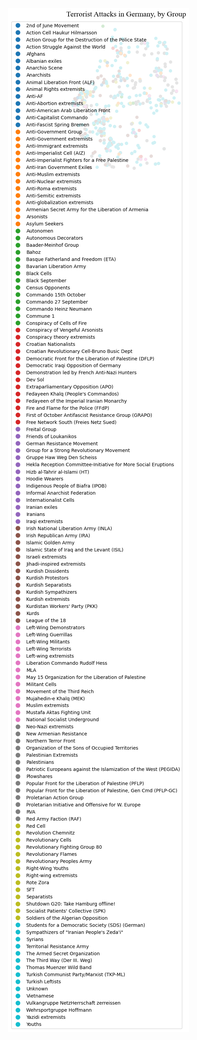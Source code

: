 \documentclass[
  letterpaper,
  DIV=11,
  numbers=noendperiod]{scrreprt}
\begin{document}
\begin{figure}[H]

{\centering \includegraphics{labs/w02_maps_files/figure-pdf/cell-42-output-2.png}

}

\end{figure}
\end{document}
